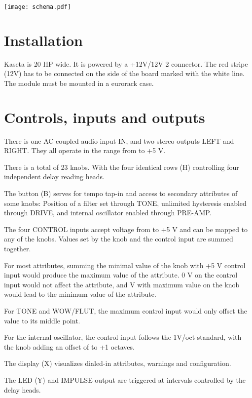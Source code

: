 \documentclass[11pt]{article}
\begin{document}
\begin{minipage}{0.6\textwidth}
\vspace{8mm}

\begin{center}
  \texttt{[image: schema.pdf]}
\end{center}

\end{minipage}

\newpage
\color{black}

\begin{minipage}[t]{0.45\textwidth}
\setlength{\parskip}{6pt}

\section{Installation}

Kaseta is 20 HP wide. It is powered by a +12V/{\textminus}12V 2
connector. The red stripe (\textminus12V) has to be connected on the side of the
board marked with the white line. The module must be mounted in a eurorack case.

\vspace{1cm}

\section{Controls, inputs and outputs}

There is one AC coupled audio input IN, and two stereo outputs LEFT and RIGHT.
They all operate in the range from  to +5 V.

There is a total of 23 knobs. With the four identical rows (H) controlling four
independent delay reading heads.

The button (B) serves for tempo tap-in and access to secondary attributes of
some knobs:
Position of a filter set through TONE,
unlimited hysteresis enabled through DRIVE,
and internal oscillator enabled through PRE-AMP.

The four CONTROL inputs accept voltage from  to +5 V and can be
mapped to any of the knobs. Values set by the knob and the control input are
summed together.

For most attributes, summing the minimal value of the knob with +5 V control
input would produce the maximum value of the attribute. 0 V on the control input
would not affect the attribute, and  V with maximum value on the knob
would lead to the minimum value of the attribute.

For TONE and WOW/FLUT, the maximum control input would only offset the
value to its middle point.

For the internal oscillator, the control input follows the 1V/oct standard, with
the knob adding an offset of  to +1 octaves.

The display (X) visualizes dialed-in attributes, warnings and configuration.

The LED (Y) and IMPULSE output are triggered at intervals controlled by the
delay heads.

\end{minipage}%
\end{document}
